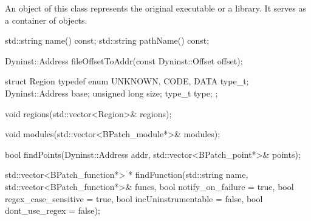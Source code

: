 
An object of this class represents the original executable or a library.
It serves as a container of  objects.

\begin{apient}
  std::string name() const;
  std::string pathName() const;
\end{apient}


\begin{apient}
  Dyninst::Address fileOffsetToAddr(const Dyninst::Offset offset);
\end{apient}


\begin{apient}
  struct Region {
    typedef enum {
      UNKNOWN,
      CODE,
      DATA
    } type_t;
    Dyninst::Address base;
    unsigned long size;
    type_t type;
  };
\end{apient}


\begin{apient}
  void regions(std::vector<Region>& regions);
\end{apient}


\begin{apient}
  void modules(std::vector<BPatch_module*>& modules);
\end{apient}


\begin{apient}
  bool findPoints(Dyninst::Address addr, std::vector<BPatch_point*>& points);
\end{apient}


\begin{apient}
  std::vector<BPatch_function*> *
  findFunction(std::string name, std::vector<BPatch_function*>& funcs,
               bool notify_on_failure = true, bool regex_case_sensitive = true,
               bool incUninstrumentable = false, bool dont_use_regex = false);
\end{apient}

